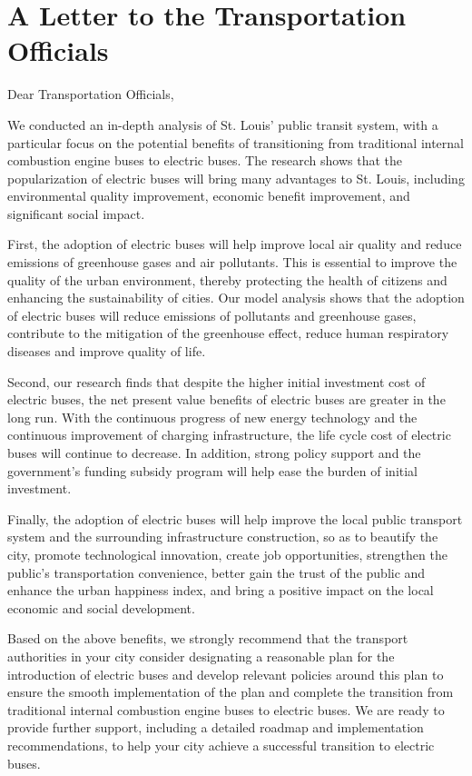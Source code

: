 \documentclass[12pt]{article}
\begin{document}
\newpage
\section{A Letter to the Transportation Officials}
Dear Transportation Officials,

We conducted an in-depth analysis of St. Louis' public transit system, with a particular focus on the potential benefits of 
transitioning from traditional internal combustion engine buses to electric buses. The research shows that the popularization of 
electric buses will bring many advantages to St. Louis, including environmental quality improvement, economic benefit improvement, 
and significant social impact.

First, the adoption of electric buses will help improve local air quality and reduce emissions of greenhouse gases and air pollutants. 
This is essential to improve the quality of the urban environment, thereby protecting the health of citizens and enhancing the 
sustainability of cities. Our model analysis shows that the adoption of electric buses will reduce emissions of pollutants and 
greenhouse gases, contribute to the mitigation of the greenhouse effect, reduce human respiratory diseases and improve quality of life.

Second, our research finds that despite the higher initial investment cost of electric buses, the net present value benefits of 
electric buses are greater in the long run. With the continuous progress of new energy technology and the continuous improvement 
of charging infrastructure, the life cycle cost of electric buses will continue to decrease. In addition, strong policy support and 
the government's funding subsidy program will help ease the burden of initial investment.

Finally, the adoption of electric buses will help improve the local public transport system and the surrounding infrastructure 
construction, so as to beautify the city, promote technological innovation, create job opportunities, strengthen the public's 
transportation convenience, better gain the trust of the public and enhance the urban happiness index, and bring a positive impact on 
the local economic and social development.

Based on the above benefits, we strongly recommend that the transport authorities in your city consider designating a reasonable plan 
for the introduction of electric buses and develop relevant policies around this plan to ensure the smooth implementation of the plan 
and complete the transition from traditional internal combustion engine buses to electric buses. We are ready to provide further 
support, including a detailed roadmap and implementation recommendations, to help your city achieve a successful transition to electric 
buses.
\end{document}
